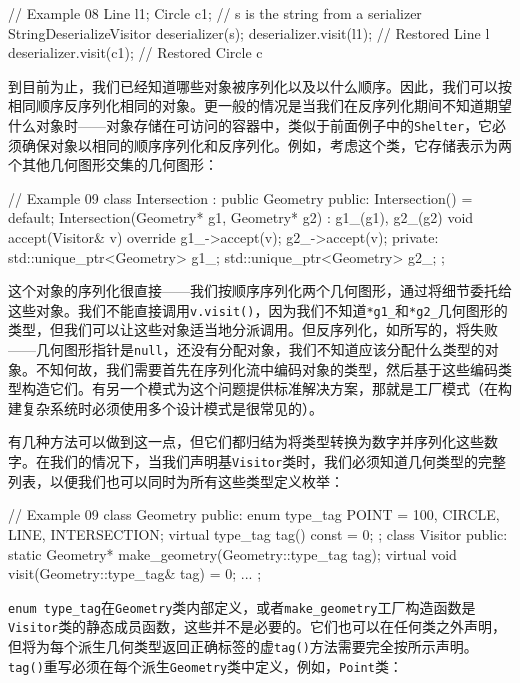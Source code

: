 \begin{code}
{\begin{code}
// Example 08
Line l1;
Circle c1;
// s is the string from a serializer
StringDeserializeVisitor deserializer(s);
deserializer.visit(l1); // Restored Line l
deserializer.visit(c1); // Restored Circle c
\end{code}

到目前为止，我们已经知道哪些对象被序列化以及以什么顺序。因此，我们可以按相同顺序反序列化相同的对象。更一般的情况是当我们在反序列化期间不知道期望什么对象时——对象存储在可访问的容器中，类似于前面例子中的\texttt{Shelter}，它必须确保对象以相同的顺序序列化和反序列化。例如，考虑这个类，它存储表示为两个其他几何图形交集的几何图形：

\begin{code}
// Example 09
class Intersection : public Geometry {
  public:
  Intersection() = default;
  Intersection(Geometry* g1, Geometry* g2) :
    g1_(g1), g2_(g2) {}
  void accept(Visitor& v) override {
    g1_->accept(v);
    g2_->accept(v);
  }
  private:
  std::unique_ptr<Geometry> g1_;
  std::unique_ptr<Geometry> g2_;
};
\end{code}

这个对象的序列化很直接——我们按顺序序列化两个几何图形，通过将细节委托给这些对象。我们不能直接调用\texttt{v.visit()}，因为我们不知道\texttt{*g1\_}和\texttt{*g2\_}几何图形的类型，但我们可以让这些对象适当地分派调用。但反序列化，如所写的，将失败——几何图形指针是\texttt{null}，还没有分配对象，我们不知道应该分配什么类型的对象。不知何故，我们需要首先在序列化流中编码对象的类型，然后基于这些编码类型构造它们。有另一个模式为这个问题提供标准解决方案，那就是工厂模式（在构建复杂系统时必须使用多个设计模式是很常见的）。

有几种方法可以做到这一点，但它们都归结为将类型转换为数字并序列化这些数字。在我们的情况下，当我们声明基\texttt{Visitor}类时，我们必须知道几何类型的完整列表，以便我们也可以同时为所有这些类型定义枚举：

\begin{code}
// Example 09
class Geometry {
  public:
  enum type_tag {POINT = 100, CIRCLE, LINE, INTERSECTION};
  virtual type_tag tag() const = 0;
};
class Visitor {
  public:
  static Geometry* make_geometry(Geometry::type_tag tag);
  virtual void visit(Geometry::type_tag& tag) = 0;
  ...
};
\end{code}

\texttt{enum\ type\_tag}在\texttt{Geometry}类内部定义，或者\texttt{make\_geometry}工厂构造函数是\texttt{Visitor}类的静态成员函数，这些并不是必要的。它们也可以在任何类之外声明，但将为每个派生几何类型返回正确标签的虚\texttt{tag()}方法需要完全按所示声明。\texttt{tag()}重写必须在每个派生\texttt{Geometry}类中定义，例如，\texttt{Point}类：

}
\end{code}
